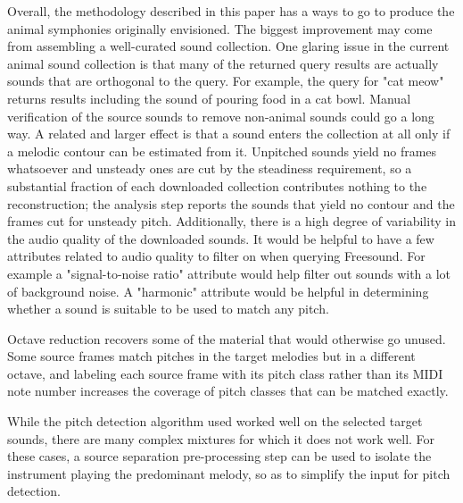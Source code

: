 \documentclass{article}
\begin{document}
Overall, the methodology described in this paper has a ways to go to produce the animal symphonies originally envisioned. The biggest improvement may come from assembling a well-curated sound collection. One glaring issue in the current animal sound collection is that many of the returned query results are actually sounds that are orthogonal to the query. For example, the query for "cat meow" returns results including the sound of pouring food in a cat bowl. Manual verification of the source sounds to remove non-animal sounds could go a long way. A related and larger effect is that a sound enters the collection at all only if a melodic contour can be estimated from it.
Unpitched sounds yield no frames whatsoever and unsteady ones are cut by the steadiness requirement, so a substantial fraction of each downloaded collection contributes nothing to the reconstruction; the analysis step reports the sounds that yield no contour and the frames cut for unsteady pitch.
Additionally, there is a high degree of variability in the audio quality of the downloaded sounds. It would be helpful to have a few attributes related to audio quality to filter on when querying Freesound. For example a "signal-to-noise ratio" attribute would help filter out sounds with a lot of background noise. A "harmonic" attribute would be helpful in determining whether a sound is suitable to be used to match any pitch.

Octave reduction recovers some of the material that would otherwise go unused. Some source frames match pitches in the target melodies but in a different octave, and labeling each source frame with its pitch class rather than its MIDI note number increases the coverage of pitch classes that can be matched exactly.

While the pitch detection algorithm used worked well on the selected target sounds, there are many complex mixtures for which it does not work well. For these cases, a source separation pre-processing step can be used to isolate the instrument playing the predominant melody, so as to simplify the input for pitch detection.




\end{document}
